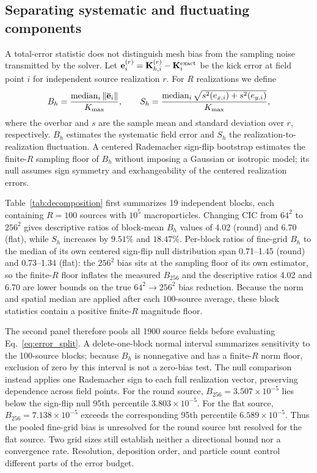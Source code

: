 \documentclass[a4paper,fleqn]{cas-sc}
\begin{document}
\subsection{Separating systematic and fluctuating components}
\label{sec:decomposition}

A total-error statistic does not distinguish mesh bias from the sampling
noise transmitted by the solver.  Let
$\mathbf e_i^{(r)}=\mathbf K_{h,i}^{(r)}-\mathbf K_i^{\rm exact}$ be the
kick error at field point $i$ for independent source realization $r$.
For $R$ realizations we define
\begin{equation}
 B_h=\frac{\mathop{\rm median}_i\|\overline{\mathbf e}_i\|}{K_{\max}},
 \qquad
 S_h=\frac{\mathop{\rm median}_i
 \sqrt{s^2(e_{x,i})+s^2(e_{y,i})}}{K_{\max}},
 \label{eq:error_split}
\end{equation}
where the overbar and $s$ are the sample mean and standard deviation over
$r$, respectively.  $B_h$ estimates the systematic field error and $S_h$
the realization-to-realization fluctuation.  A centered Rademacher
sign-flip bootstrap estimates the finite-$R$ sampling floor of $B_h$ without
imposing a Gaussian or isotropic model; its null assumes sign symmetry and
exchangeability of the centered realization errors.

Table~\ref{tab:decomposition} first summarizes 19 independent blocks, each
containing $R=100$ sources with $10^5$ macroparticles.  Changing CIC from
$64^2$ to $256^2$ gives descriptive ratios of block-mean $B_h$ values of 4.02
(round) and 6.70 (flat), while $S_h$ increases by $9.51\%$ and $18.47\%$.
Per-block ratios of fine-grid $B_h$ to the median of its own centered
sign-flip null distribution span 0.71--1.45 (round) and 0.73--1.34 (flat):
the $256^2$ bias sits at the sampling floor of its own estimator, so the
finite-$R$ floor inflates the measured $B_{256}$ and the descriptive ratios
4.02 and 6.70 are lower bounds on the true $64^2\!\rightarrow\!256^2$ bias
reduction.  Because the norm and spatial median are
applied after each 100-source average, these block statistics contain a
positive finite-$R$ magnitude floor.

The second panel therefore pools all 1900 source fields before evaluating
Eq.~\eqref{eq:error_split}.  A delete-one-block normal interval summarizes
sensitivity to the 100-source blocks; because $B_h$ is nonnegative and has a
finite-$R$ norm floor, exclusion of zero by this interval is not a zero-bias
test.  The null comparison instead applies one Rademacher sign to each full
realization vector, preserving dependence across field points.  For the round
source,
$B_{256}=3.507\times10^{-5}$ lies below the sign-flip null 95th percentile
$3.803\times10^{-5}$.  For the flat source,
$B_{256}=7.138\times10^{-5}$ exceeds the corresponding 95th percentile
$6.589\times10^{-5}$.  Thus the pooled
fine-grid bias is unresolved for the round source but resolved for the flat
source.  Two grid sizes still establish neither a directional bound nor a
convergence rate.  Resolution, deposition order, and particle count control
different parts of the error budget.
\end{document}
